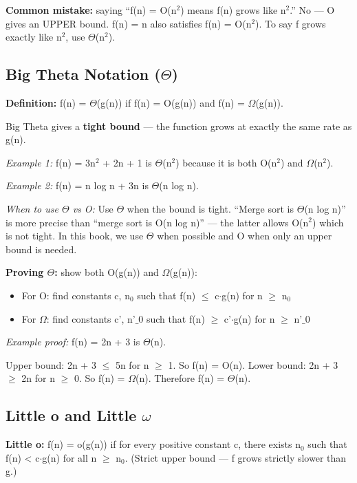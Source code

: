 \textbf{Common mistake:} saying ``f(n) = O(n$^{2}$) means f(n) grows like n$^{2}$.'' No — O gives an UPPER bound. f(n) = n also satisfies f(n) = O(n$^{2}$). To say f grows exactly like n$^{2}$, use $\Theta $(n$^{2}$).

\subsection{Big Theta Notation (\texorpdfstring{$\Theta$}{Theta})}

\textbf{Definition:} f(n) = $\Theta $(g(n)) if f(n) = O(g(n)) and f(n) = $\Omega $(g(n)).

Big Theta gives a \textbf{tight bound} — the function grows at exactly the same rate as g(n).

\textit{Example 1:} f(n) = 3n$^{2}$ + 2n + 1 is $\Theta $(n$^{2}$) because it is both O(n$^{2}$) and $\Omega $(n$^{2}$).

\textit{Example 2:} f(n) = n log n + 3n is $\Theta $(n log n).

\textit{When to use $\Theta $ vs O:} Use $\Theta $ when the bound is tight. ``Merge sort is $\Theta $(n log n)'' is more precise than ``merge sort is O(n log n)'' — the latter allows O(n$^{2}$) which is not tight. In this book, we use $\Theta $ when possible and O when only an upper bound is needed.

\textbf{Proving $\Theta $:} show both O(g(n)) and $\Omega $(g(n)):
\begin{itemize}
\item For O: find constants c, n$_{0}$ such that f(n) $\le $ c$\cdot $g(n) for n $\ge $ n$_{0}$
\item For $\Omega $: find constants c', n'$\_{0}$ such that f(n) $\ge $ c'$\cdot $g(n) for n $\ge $ n'$\_{0}$
\end{itemize}

\textit{Example proof:} f(n) = 2n + 3 is $\Theta $(n).

Upper bound: 2n + 3 $\le $ 5n for n $\ge $ 1. So f(n) = O(n).  
Lower bound: 2n + 3 $\ge $ 2n for n $\ge $ 0. So f(n) = $\Omega $(n).  
Therefore f(n) = $\Theta $(n).

\subsection{Little o and Little \texorpdfstring{$\omega$}{omega}}

\textbf{Little o:} f(n) = o(g(n)) if for every positive constant c, there exists n$_{0}$ such that f(n) < c$\cdot $g(n) for all n $\ge $ n$_{0}$. (Strict upper bound — f grows strictly slower than g.)

